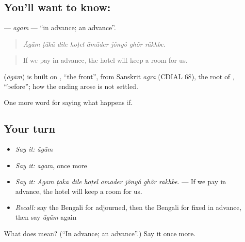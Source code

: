 \subsection*{You'll want to know: }
\textbf{} — \emph{āgām} — \textquotedblleft{}in advance; an advance\textquotedblright{}.

\begin{quote}
       
\end{quote}

\begin{quote}
\emph{Āgām ṭākā dile hoṭel āmāder jônyô ghôr rākhbe.}
\end{quote}

\begin{quote}
If we pay in advance, the hotel will keep a room for us.
\end{quote}

\begin{cousinweb}
\textbf{} (\emph{āgām}) is built on , \textquotedblleft{}the front\textquotedblright{}, from Sanskrit \emph{agra} (CDIAL 68), the root of , \textquotedblleft{}before\textquotedblright{}; how the ending arose is not settled.
\end{cousinweb}

\begin{grammarlens}[title={What you've built}]
One more word for saying what happens if.
\end{grammarlens}

\subsection*{Your turn}
\begin{itemize}
\raggedright
  \item \emph{Say it:} \emph{āgām}
  \item \emph{Say it:} \emph{āgām}, once more
  \item \emph{Say it:} \emph{Āgām ṭākā dile hoṭel āmāder jônyô ghôr rākhbe.} — If we pay in advance, the hotel will keep a room for us.
  \item \emph{Recall:} say the Bengali for adjourned, then the Bengali for fixed in advance, then say \emph{āgām} again
\end{itemize}

\begin{tcolorbox}[breakable,colback=teal!4,colframe=teal!35!black,title={Before you move on}]
What does  mean? (\textquotedblleft{}In advance; an advance\textquotedblright{}.) Say it once more.
\end{tcolorbox}
